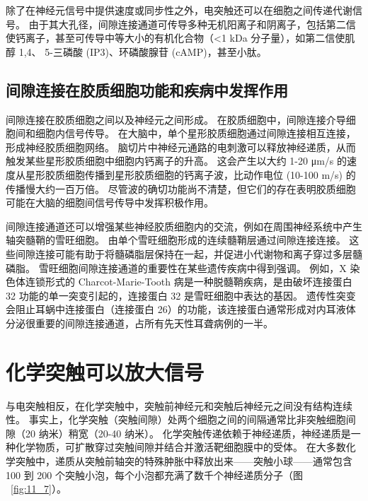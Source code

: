除了在神经元信号中提供速度或同步性之外，电突触还可以在细胞之间传递代谢信号。
由于其大孔径，间隙连接通道可传导多种无机阳离子和阴离子，包括第二信使钙离子，甚至可传导中等大小的有机化合物（<1 kDa 分子量），如第二信使肌醇 1,4、 5-三磷酸 (IP3)、环磷酸腺苷 (cAMP)，甚至小肽。



\subsection{间隙连接在胶质细胞功能和疾病中发挥作用}

间隙连接在胶质细胞之间以及神经元之间形成。
在胶质细胞中，间隙连接介导细胞间和细胞内信号传导。 
在大脑中，单个星形胶质细胞通过间隙连接相互连接，形成神经胶质细胞网络。
脑切片中神经元通路的电刺激可以释放神经递质，从而触发某些星形胶质细胞中细胞内钙离子的升高。
这会产生以大约 1-20 μm/s 的速度从星形胶质细胞传播到星形胶质细胞的钙离子波，比动作电位 (10-100 m/s) 的传播慢大约一百万倍。
尽管波的确切功能尚不清楚，但它们的存在表明胶质细胞可能在大脑的细胞间信号传导中发挥积极作用。


间隙连接通道还可以增强某些神经胶质细胞内的交流，例如在周围神经系统中产生轴突髓鞘的雪旺细胞。
由单个雪旺细胞形成的连续髓鞘层通过间隙连接连接。
这些间隙连接可能有助于将髓磷脂层保持在一起，并促进小代谢物和离子穿过多层髓磷脂。
雪旺细胞间隙连接通道的重要性在某些遗传疾病中得到强调。
例如，X 染色体连锁形式的 Charcot-Marie-Tooth 病是一种脱髓鞘疾病，是由破坏连接蛋白 32 功能的单一突变引起的，连接蛋白 32 是雪旺细胞中表达的基因。
遗传性突变会阻止耳蜗中连接蛋白（连接蛋白 26）的功能，该连接蛋白通常形成对内耳液体分泌很重要的间隙连接通道，占所有先天性耳聋病例的一半。



\section{化学突触可以放大信号}

与电突触相反，在化学突触中，突触前神经元和突触后神经元之间没有结构连续性。
事实上，化学突触（突触间隙）处两个细胞之间的间隔通常比非突触细胞间隙（20 纳米）稍宽（20-40 纳米）。
化学突触传递依赖于神经递质，神经递质是一种化学物质，可扩散穿过突触间隙并结合并激活靶细胞膜中的受体。
在大多数化学突触中，递质从突触前轴突的特殊肿胀中释放出来——突触小球——通常包含 100 到 200 个突触小泡，每个小泡都充满了数千个神经递质分子（图 ~\ref{fig:11_7}）。


